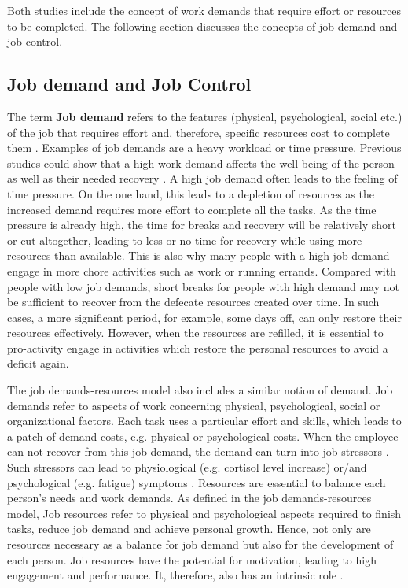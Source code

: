 \documentclass{hasel_thesis}
\begin{document}
Both studies include the concept of work demands that require effort or resources to be completed. The following section discusses the concepts of job demand and job control.



\subsection{Job demand and Job Control}
The term \textbf{Job demand} refers to the features (physical, psychological, social etc.) of the job that requires effort and, therefore, specific resources cost to complete them \cite{Trougakos.2009}. Examples of job demands are a heavy workload or time pressure. Previous studies could show that a high work demand affects the well-being \cite{Sonnentag.2003} of the person as well as their needed recovery \cite{Sonnentag.2006}. A high job demand often leads to the feeling of time pressure. On the one hand, this leads to a depletion of resources as the increased demand requires more effort to complete all the tasks. As the time pressure is already high, the time for breaks and recovery will be relatively short or cut altogether, leading to less or no time for recovery while using more resources than available. This is also why many people with a high job demand engage in more chore activities such as work or running errands.
Compared with people with low job demands, short breaks for people with high demand may not be sufficient to recover from the defecate resources created over time. In such cases, a more significant period, for example, some days off, can only restore their resources effectively. However, when the resources are refilled, it is essential to pro-activity engage in activities which restore the personal resources to avoid a deficit again.


The job demands-resources model \cite{BakkerA.B.DemeroutiE.DeBoerE.andSchaufeliW.B..2003b, DemeroutiE.BakkerA.B.NachreinerF.andSchaufeliW.B..2001a} also includes a similar notion of demand. Job demands refer to aspects of work concerning physical, psychological, social or organizational factors. Each task uses a particular effort and skills, which leads to a patch of demand costs, e.g. physical or psychological costs. When the employee can not recover from this job demand, the demand can turn into job stressors \cite{Hobfoll.1998}. Such stressors can lead to physiological (e.g. cortisol level increase) or/and psychological (e.g. fatigue) symptoms \cite{Sonnentag.2022}. Resources are essential to balance each person's needs and work demands. As defined in the job demands-resources model, Job resources refer to physical and psychological aspects required to finish tasks, reduce job demand and achieve personal growth. Hence, not only are resources necessary as a balance for job demand but also for the development of each person. Job resources have the potential for motivation, leading to high engagement and performance. It, therefore, also has an intrinsic role \cite{Bakker.2007}.
\end{document}
